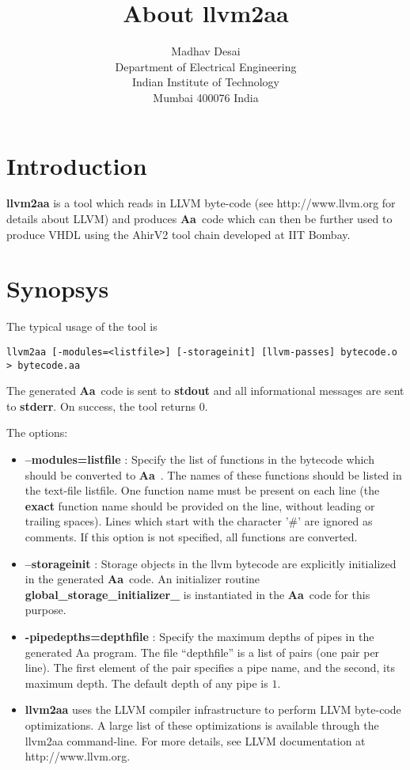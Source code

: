 \documentclass{article}
\title{About {\bf llvm2aa}}
\author{Madhav Desai \\ Department of Electrical Engineering \\ Indian Institute of Technology \\
	Mumbai 400076 India}
\newcommand{\Aa}{{\bf Aa}~}
\begin{document}
\maketitle

\section{Introduction}

{\bf llvm2aa}  is a tool which reads in LLVM byte-code (see http://www.llvm.org for
details about LLVM) and produces \Aa code which can then be further used
to produce VHDL using the AhirV2 tool chain developed at IIT Bombay.

\section{Synopsys}

The typical usage of the tool is 
\begin{verbatim}
llvm2aa [-modules=<listfile>] [-storageinit] [llvm-passes] bytecode.o > bytecode.aa
\end{verbatim}
The generated \Aa code is sent to {\bf stdout} and all informational
messages are sent to {\bf stderr}.  On success, the tool returns 0.

The options:
\begin{itemize}
\item {\bf --modules=listfile} : Specify the list of functions in the bytecode
which should be converted to \Aa.   The names of these functions should be
listed in the text-file listfile.  One function name must be present
on each line (the {\bf exact} function name should be provided on the line, without leading
or trailing spaces).  Lines which start with the character '\#' are
ignored as comments.  If this option is not specified, all functions
are converted.  
\item {\bf --storageinit} :  Storage objects in the llvm bytecode
are explicitly initialized in the generated \Aa code.   An initializer
routine {\bf global\_storage\_initializer\_} is instantiated in
the \Aa code for this purpose.
\item {\bf -pipedepths=depthfile} : Specify the maximum depths of
pipes in the generated Aa program. The file ``depthfile'' is a list
of pairs (one pair per line).  The first element of the pair specifies
a pipe name, and the second, its maximum depth.   The default depth
of any pipe is $1$.
\item {\bf llvm2aa} uses the LLVM compiler
infrastructure to perform LLVM byte-code optimizations.  A large list
of these optimizations is available through the llvm2aa command-line.
For more details, see LLVM documentation at http://www.llvm.org.
\end{itemize}
\end{document}
